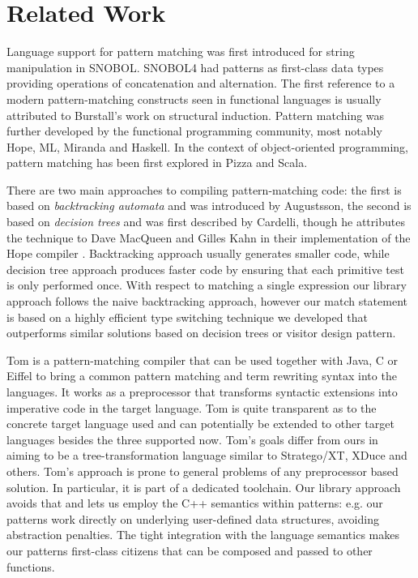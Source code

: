 \documentclass{llncs}
\begin{document}
\section{Related Work} %
\label{sec:rw}

Language support for pattern matching was first introduced for string 
manipulation in SNOBOL\cite{SNOBOL64}. SNOBOL4 had patterns as first-class data 
types providing operations of concatenation and alternation\cite{SNOBOL71}. The 
first reference to a modern pattern-matching constructs seen in functional 
languages is usually attributed to Burstall's work on structural 
induction\cite{Burstall69provingproperties}. Pattern matching was further 
developed by the functional programming community, most notably 
Hope\cite{BMS80}, ML\cite{ML90}, Miranda\cite{Miranda85} and 
Haskell\cite{Haskell98Book}. In the context of object-oriented programming, 
pattern matching has been first explored in Pizza\cite{Odersky97pizzainto} and 
Scala\cite{Scala2nd,EmirThesis}.

There are two main approaches to compiling pattern-matching code: the first is 
based on \emph{backtracking automata} and was introduced by Augustsson\cite{Augustsson85}, 
the second is based on \emph{decision trees} and was first described by 
Cardelli\cite{Cardelli84}, though he attributes the technique to Dave MacQueen 
and Gilles Kahn in their implementation of the Hope compiler \cite{BMS80}.
Backtracking approach usually generates smaller code, while decision tree 
approach produces faster code by ensuring that each primitive test is only 
performed once. With respect to matching a single expression our library 
approach follows the naive backtracking approach, however our match statement is 
based on a highly efficient type switching technique we developed\cite{TypeSwitch} 
that outperforms similar solutions based on decision trees or visitor design pattern.

Tom is a pattern-matching compiler that can be used together with Java, C or 
Eiffel to bring a common pattern matching and term rewriting syntax into the 
languages\cite{Moreau:2003}. It works as a preprocessor that transforms 
syntactic extensions into imperative code in the target language. Tom is quite 
transparent as to the concrete target language used and can potentially be 
extended to other target languages besides the three supported now.
Tom's  goals differ from ours in aiming to be a
tree-transformation language similar to Stratego/XT, XDuce and others. 
Tom's approach is prone to general problems of any preprocessor based 
solution\cite[]{SELL}. In particular, it is part of a dedicated toolchain.
Our library approach avoids that and lets us employ the C++ semantics within 
patterns: e.g. our patterns work directly on underlying user-defined data 
structures, avoiding abstraction penalties. The tight integration with 
the language semantics makes our patterns first-class citizens that can be 
composed and passed to other functions. 
\end{document}
